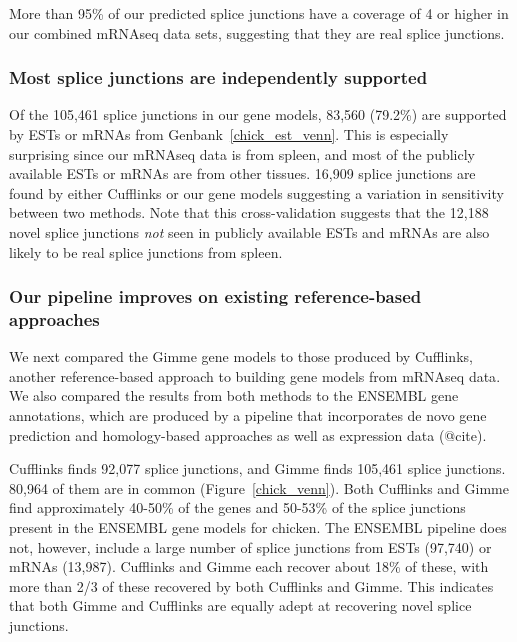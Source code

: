\documentclass[10pt]{article}
\begin{document}
More than 95\% of our predicted splice junctions have a coverage
of 4 or higher in our combined mRNAseq data sets, suggesting that they are
real splice junctions.


\subsubsection*{Most splice junctions are independently supported}

Of the 105,461 splice junctions in our gene models, 83,560 (79.2\%) are
supported by ESTs or mRNAs from Genbank~\ref{chick_est_venn}.  This is
especially surprising since our mRNAseq data is from spleen, and most of the
publicly available ESTs or mRNAs are from other tissues. 16,909 splice junctions
are found by either Cufflinks or our gene models suggesting a variation in
sensitivity between two methods. Note that this cross-validation suggests that
the 12,188 novel splice junctions {\em not} seen in publicly available ESTs and
mRNAs are also likely to be real splice junctions from spleen.


\subsubsection*{Our pipeline improves on existing reference-based approaches}

We next compared the Gimme gene models to those produced by Cufflinks,
another reference-based approach to building gene models from mRNAseq
data\cite{Trapnell:2010kd}.  We also compared the results from both
methods to the ENSEMBL gene annotations, which are produced by a
pipeline that incorporates de novo gene prediction and homology-based
approaches as well as expression data (@cite).

Cufflinks finds 92,077 splice junctions, and Gimme finds 105,461 splice
junctions.  80,964 of them are in common (Figure~\ref{chick_venn}). Both
Cufflinks and Gimme find approximately 40-50\% of the genes and 50-53\% of the
splice junctions present in the ENSEMBL gene models for chicken.  The ENSEMBL
pipeline does not, however, include a large number of splice junctions from ESTs
(97,740) or mRNAs (13,987).  Cufflinks and Gimme each recover about 18\% of
these, with more than 2/3 of these recovered by both Cufflinks and Gimme.  This
indicates that both Gimme and Cufflinks are equally adept at recovering novel
splice junctions.
\end{document}
